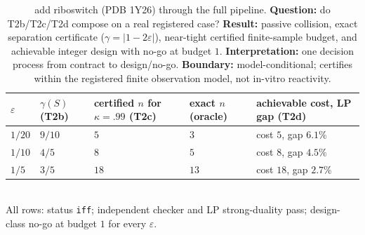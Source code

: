 \documentclass[11pt]{article}
\begin{document}
\begin{table}[ht]
\centering
\caption{add riboswitch (PDB 1Y26) through the full pipeline. \textbf{Question:} do T2b/T2c/T2d
compose on a real registered case? \textbf{Result:} passive collision, exact separation certificate
($\gamma=|1-2\varepsilon|$), near-tight certified finite-sample budget, and achievable integer design
with no-go at budget $1$. \textbf{Interpretation:} one decision process from contract to design/no-go.
\textbf{Boundary:} model-conditional; certifies within the registered finite observation model, not
in-vitro reactivity.}
\label{tab:real}
\begin{tabularx}{\textwidth}{@{}lllXX@{}}
\toprule
$\varepsilon$ & $\gamma(S)$ (T2b) & certified $n$ for $\kappa=.99$ (T2c) & exact $n$ (oracle) & achievable cost, LP gap (T2d) \\
\midrule
$1/20$ & $9/10$ & $5$ & $3$ & cost $5$, gap $6.1\%$ \\
$1/10$ & $4/5$ & $8$ & $5$ & cost $8$, gap $4.5\%$ \\
$1/5$  & $3/5$ & $18$ & $13$ & cost $18$, gap $2.7\%$ \\
\bottomrule
\end{tabularx}
\\[0.5em]
\footnotesize All rows: status \texttt{iff}; independent checker and LP strong-duality pass; design-class
no-go at budget $1$ for every $\varepsilon$.
\end{table}
\end{document}

